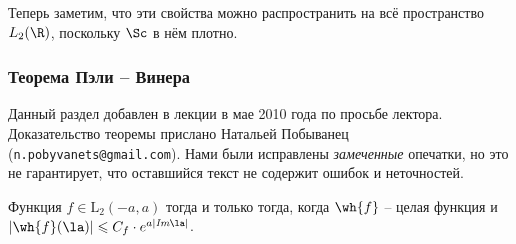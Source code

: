 \documentclass[a4paper]{article}
\begin{document}
Теперь заметим, что эти свойства можно распространить на всё пространство $L_2(\R)$,
поскольку $\Sc$ в нём плотно.

\subsubsection{Теорема Пэли -- Винера}

\begin{petit}
Данный раздел добавлен в лекции в мае 2010 года по просьбе лектора. Доказательство теоремы
прислано Натальей Побыванец (\texttt{n.pobyvanets@gmail.com}). Нами были исправлены \emph{замеченные}
опечатки, но это не гарантирует, что оставшийся текст не содержит ошибок и неточностей.
\end{petit}

\begin{theorem}
Функция $f \in \mbox{L}_2(-a,a)$ тогда и только тогда, когда
$\wh{f}$ -- целая функция и $|\wh{f}(\la)| \leqslant C_f \cdot e^{a|\emph{Im}\la|}$.
\end{theorem}
\end{document}
